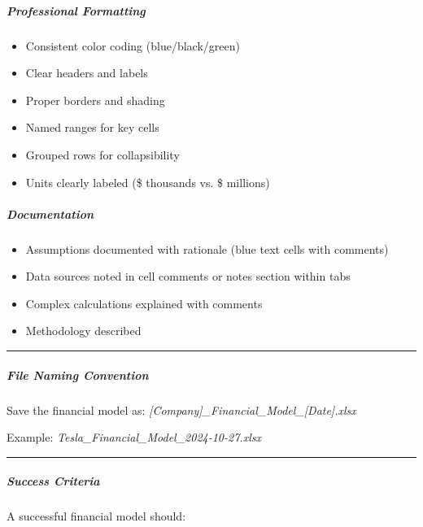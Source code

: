 \documentclass[11pt]{article}
\begin{document}
\subparagraph{Professional Formatting}\mbox{}\par
\begin{itemize}[leftmargin=*,itemsep=2pt,topsep=2pt]
\item {} Consistent color coding (blue/black/green)
\item {} Clear headers and labels
\item {} Proper borders and shading
\item {} Named ranges for key cells
\item {} Grouped rows for collapsibility
\item {} Units clearly labeled (\$ thousands vs. \$ millions)
\end{itemize}

\subparagraph{Documentation}\mbox{}\par
\begin{itemize}[leftmargin=*,itemsep=2pt,topsep=2pt]
\item {} Assumptions documented with rationale (blue text cells with comments)
\item {} Data sources noted in cell comments or notes section within tabs
\item {} Complex calculations explained with comments
\item {} Methodology described
\end{itemize}

\vspace{0.5em}\hrule\vspace{0.5em}

\subparagraph{File Naming Convention}\mbox{}\par

Save the financial model as: \emph{[Company]\_\allowbreak{}Financial\_\allowbreak{}Model\_\allowbreak{}[Date].xlsx}


Example: \emph{Tesla\_\allowbreak{}Financial\_\allowbreak{}Model\_\allowbreak{}2024-10-27.xlsx}


\vspace{0.5em}\hrule\vspace{0.5em}

\subparagraph{Success Criteria}\mbox{}\par

A successful financial model should:
\end{document}
